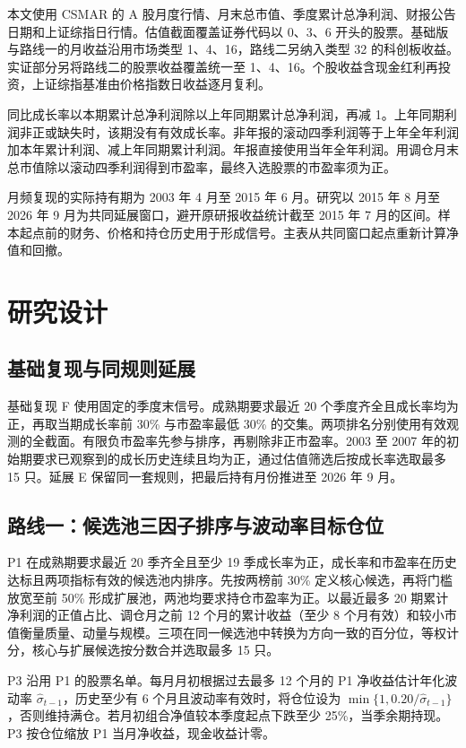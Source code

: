 本文使用 CSMAR 的 A 股月度行情、月末总市值、季度累计总净利润、财报公告日期和上证综指日行情。估值截面覆盖证券代码以 0、3、6 开头的股票。基础版与路线一的月收益沿用市场类型 1、4、16，路线二另纳入类型 32 的科创板收益。实证部分另将路线二的股票收益覆盖统一至 1、4、16。个股收益含现金红利再投资，上证综指基准由价格指数日收益逐月复利。

同比成长率以本期累计总净利润除以上年同期累计总净利润，再减 1。上年同期利润非正或缺失时，该期没有有效成长率。非年报的滚动四季利润等于上年全年利润加本年累计利润、减上年同期累计利润。年报直接使用当年全年利润。用调仓月末总市值除以滚动四季利润得到市盈率，最终入选股票的市盈率须为正。

月频复现的实际持有期为 2003 年 4 月至 2015 年 6 月。研究以 2015 年 8 月至 2026 年 9 月为共同延展窗口，避开原研报收益统计截至 2015 年 7 月的区间。样本起点前的财务、价格和持仓历史用于形成信号。主表从共同窗口起点重新计算净值和回撤。

\section{研究设计}

\subsection{基础复现与同规则延展}

基础复现 F 使用固定的季度末信号。成熟期要求最近 20 个季度齐全且成长率均为正，再取当期成长率前 30\% 与市盈率最低 30\% 的交集。两项排名分别使用有效观测的全截面。有限负市盈率先参与排序，再剔除非正市盈率。2003 至 2007 年的初始期要求已观察到的成长历史连续且均为正，通过估值筛选后按成长率选取最多 15 只。延展 E 保留同一套规则，把最后持有月份推进至 2026 年 9 月。

\subsection{路线一：候选池三因子排序与波动率目标仓位}

P1 在成熟期要求最近 20 季齐全且至少 19 季成长率为正，成长率和市盈率在历史达标且两项指标有效的候选池内排序。先按两榜前 30\% 定义核心候选，再将门槛放宽至前 50\% 形成扩展池，两池均要求持仓市盈率为正。以最近最多 20 期累计净利润的正值占比、调仓月之前 12 个月的累计收益（至少 8 个月有效）和较小市值衡量质量、动量与规模。三项在同一候选池中转换为方向一致的百分位，等权计分，核心与扩展候选按分数合并选取最多 15 只。

P3 沿用 P1 的股票名单。每月月初根据过去最多 12 个月的 P1 净收益估计年化波动率 $\widehat{\sigma}_{t-1}$，历史至少有 6 个月且波动率有效时，将仓位设为 $\min\{1,0.20/\widehat{\sigma}_{t-1}\}$，否则维持满仓。若月初组合净值较本季度起点下跌至少 25\%，当季余期持现。P3 按仓位缩放 P1 当月净收益，现金收益计零。

